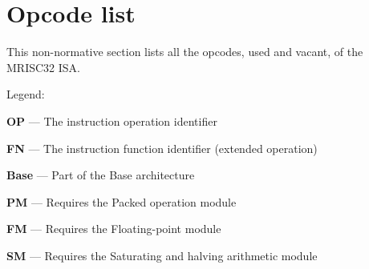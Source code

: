 %

\onecolumn

\chapter{Opcode list}

This non-normative section lists all the opcodes, used and vacant, of the
MRISC32 ISA.

Legend:
\begin{bulletitems}
  \item{\textbf{OP} --- The instruction operation identifier}
  \item{\textbf{FN} --- The instruction function identifier (extended operation)}
  \item{\textbf{Base} --- Part of the Base architecture}
  \item{\textbf{PM} --- Requires the Packed operation module}
  \item{\textbf{FM} --- Requires the Floating-point module}
  \item{\textbf{SM} --- Requires the Saturating and halving arithmetic module}
\end{bulletitems}



\twocolumn
